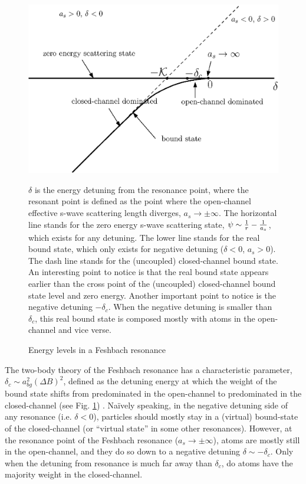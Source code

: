 \documentclass[reprint,pra]{revtex4-1}
\begin{document}
\begin{figure}[htbp]
\begin{center}
\includegraphics[width=0.8\columnwidth]{levels}
\caption{Energy levels in a Feshbach resonance\label{fig:intro:levels}} 
\parbox{0.9\columnwidth}{\raggedright \small $\delta$ is the energy detuning from the resonance point, where the resonant point is defined as the point where the open-channel effective s-wave scattering length diverges, $a_s\to\pm\infty$.  The horizontal line stands for the zero energy s-wave scattering state, $\psi\sim\frac{1}{r}-\frac{1}{a_s}$, which exists for any detuning.  The lower line stands for the real bound state, which only exists for negative detuning ($\delta<0$, $a_s>0$). The dash line stands for the (uncoupled) closed-channel bound state.  An interesting point to notice is that the real bound state appears earlier than the cross point of the (uncoupled) closed-channel bound state level and zero energy. Another important point to notice is the negative detuning $-\delta_c$.  When the negative detuning is smaller than $\delta_c$, this real bound state is composed mostly with atoms in the open-channel and vice verse.  %
}

\end{center}
\end{figure}

  The two-body theory of the Feshbach resonance has a characteristic  parameter, $\delta_c\sim{}a_{bg}^2(\Delta{B})^2$, defined as  the detuning energy at which the weight of the bound state shifts from predominated in the open-channel to predominated in the closed-channel (see Fig. \ref{fig:intro:levels}) \cite{Leggett}.  Na\"{i}vely speaking, in the negative detuning side of any resonance (i.e. $\delta<0$), particles should mostly stay  in a (virtual) bound-state of the closed-channel (or ``virtual state'' in some other resonances).  However, at the resonance point  of the Feshbach resonance ($a_s\to\pm\infty$), atoms are mostly still in the open-channel, and they do so down to a negative detuning $\delta\sim-\delta_c$. Only when the detuning from resonance is much far away than $\delta_c$, do atoms have the majority weight in the closed-channel.    
  
\end{document}
